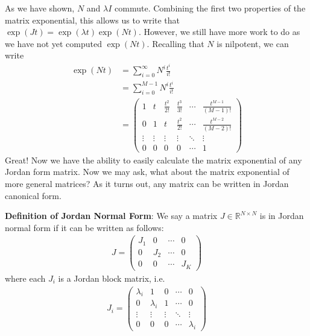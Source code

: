 \documentclass[a4paper,11pt]{exam}
\newcommand{\field}[1]{\ensuremath{\mathbb{#1}}}
\newcommand{\reals}{\field{R}}
\begin{document}
\begin{questions}
As we have shown, $N$ and $\lambda I$ commute.  Combining the first two properties of the matrix exponential, this allows us to write that $    \exp(J t) = \exp(\lambda t) \exp(N t)$.  However, we still have more work to do as we have not yet computed $\exp(Nt)$.  Recalling that $N$ is nilpotent, we can write
\begin{align}
    \exp(Nt) &= \sum_{i=0}^{\infty} N^i \frac{t^i}{i!}\\
    &= \sum_{i=0}^{M-1} N^i \frac{t^i}{i!}\\
    &= \begin{pmatrix} 1 & t & \frac{t^2}{2!} & \frac{t^3}{3!} & \cdots & \frac{t^{M-1}}{(M-1)!}\\
        0 & 1 & t & \frac{t^2}{2!} & \cdots & \frac{t^{M-2}}{(M-2)!}\\
        \vdots & \vdots & \vdots & \vdots & \ddots & \vdots\\
        0 & 0 & 0 & 0 & \cdots & 1
    \end{pmatrix}
\end{align}
Great! Now we have the ability to easily calculate the matrix exponential of any Jordan form matrix.  Now we may ask, what about the matrix exponential of more general matrices? As it turns out, any matrix can be written in Jordan canonical form.
\begin{tcolorbox}[colback=black!1!,title=Jordan normal form]
    \textbf{Definition of Jordan Normal Form}: We say a matrix $J \in \reals^{N \times N}$ is in Jordan normal form if it can be written as follows:
    \begin{align}
        J = \begin{pmatrix} J_1 & 0 & \cdots & 0\\
        0 & J_2 & \cdots & 0\\
        0 & 0 & \cdots & J_K\end{pmatrix}
    \end{align}
    where each $J_i$ is a Jordan block matrix, i.e.
    \begin{align}
        J_i = \begin{pmatrix} \lambda_i & 1 & 0 & \cdots & 0\\
            0 & \lambda_i & 1 & \cdots & 0\\
            \vdots & \vdots & \vdots & \ddots & \vdots\\
            0 & 0 & 0 & \cdots & \lambda_i
        \end{pmatrix}
    \end{align}
\end{tcolorbox}


\end{questions}
\end{document}
